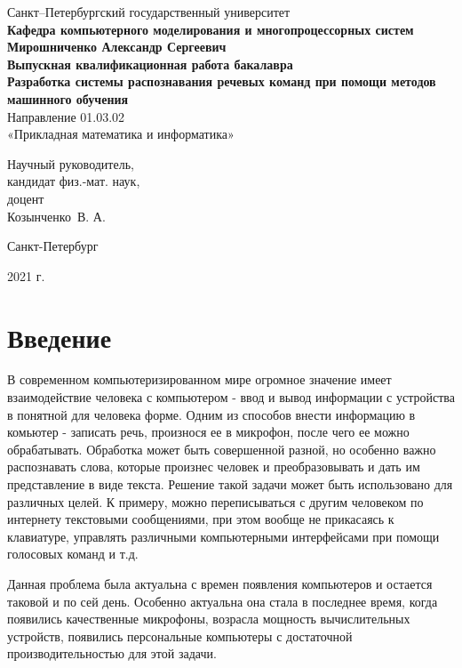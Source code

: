 \documentclass[14pt]{article}
\begin{document}
\begin{titlepage}
\begin{center}
Санкт--Петербургский государственный университет \\
\textbf{Кафедра компьютерного моделирования и многопроцессорных систем}
\vspace{55mm} \\
\textbf{\large Мирошниченко Александр Сергеевич} \\[10mm]
\textbf{\large Выпускная квалификационная работа бакалавра} \\[10mm]
\textbf{\large Разработка системы распознавания речевых команд при помощи методов машинного обучения} \\
Направление 01.03.02 \\
«Прикладная математика и информатика»\\[30mm]
\begin{flushright}
{Научный руководитель,} \\
кандидат физ.-мат. наук, \\доцент \\Козынченко~В. А. 
\end{flushright}
\vfill 
{Санкт-Петербург}
\par{2021 г.}
\end{center}
\end{titlepage}
\addtocounter{page}{1}

\tableofcontents
\newpage

\section*{Введение}
В современном компьютеризированном мире огромное значение имеет взаимодействие человека с компьютером - ввод и вывод информации с устройства в понятной для человека форме. Одним из способов внести информацию в комьютер - записать речь, произнося ее в микрофон, после чего ее можно обрабатывать. Обработка может быть совершенной разной, но особенно важно распознавать слова, которые произнес человек и преобразовывать и дать им представление в виде текста. Решение такой задачи может быть использовано для различных целей. К примеру, можно переписываться с другим человеком по интернету текстовыми сообщениями, при этом вообще не прикасаясь к клавиатуре, управлять различными компьютерными интерфейсами при помощи голосовых команд и т.д.

Данная проблема была актуальна с времен появления компьютеров и остается таковой и по сей день. Особенно актуальна она стала в последнее время, когда появились качественные микрофоны, возрасла мощность вычислительных устройств, появились персональные компьютеры с достаточной производительностью для этой задачи.
\end{document}
